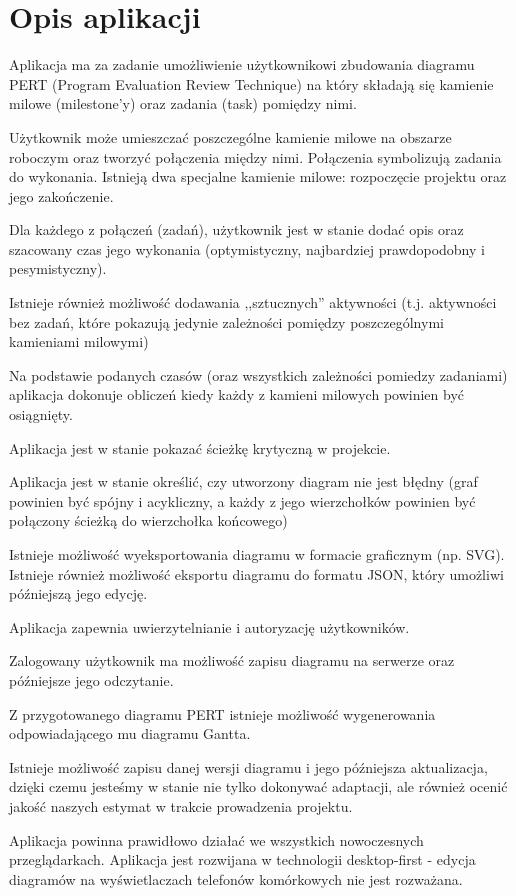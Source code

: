 \section{Opis aplikacji}
Aplikacja ma za zadanie umożliwienie użytkownikowi zbudowania diagramu PERT (Program Evaluation Review Technique) na który składają się kamienie milowe (milestone'y) oraz zadania (task) pomiędzy nimi.

Użytkownik może umieszczać poszczególne kamienie milowe na obszarze roboczym oraz tworzyć połączenia między nimi. Połączenia symbolizują zadania do wykonania. Istnieją dwa specjalne kamienie milowe: rozpoczęcie projektu oraz jego zakończenie.

Dla każdego z połączeń (zadań), użytkownik jest w stanie dodać opis oraz szacowany czas jego wykonania (optymistyczny, najbardziej prawdopodobny i pesymistyczny). 

Istnieje również możliwość dodawania ,,sztucznych'' aktywności (t.j. aktywności bez zadań, które pokazują jedynie zależności pomiędzy poszczególnymi kamieniami milowymi)

Na podstawie podanych czasów (oraz wszystkich zależności pomiedzy zadaniami) aplikacja dokonuje obliczeń kiedy każdy z kamieni milowych powinien być osiągnięty.

Aplikacja jest w stanie pokazać ścieżkę krytyczną w projekcie.

Aplikacja jest w stanie określić, czy utworzony diagram nie jest błędny (graf powinien być spójny i acykliczny, a każdy z jego wierzchołków powinien być połączony ścieżką do wierzchołka końcowego)

Istnieje możliwość wyeksportowania diagramu w formacie graficznym (np. SVG). Istnieje również możliwość eksportu diagramu do formatu JSON, który umożliwi późniejszą jego edycję.

Aplikacja zapewnia uwierzytelnianie i autoryzację użytkowników.

Zalogowany użytkownik ma możliwość zapisu diagramu na serwerze oraz późniejsze jego odczytanie.

Z przygotowanego diagramu PERT istnieje możliwość wygenerowania odpowiadającego mu diagramu Gantta.

Istnieje możliwość zapisu danej wersji diagramu i jego późniejsza aktualizacja, dzięki czemu jesteśmy w stanie nie tylko dokonywać adaptacji, ale również ocenić jakość naszych estymat w trakcie prowadzenia projektu.

Aplikacja powinna prawidłowo działać we wszystkich nowoczesnych przeglądarkach. Aplikacja jest rozwijana w technologii desktop-first - edycja diagramów na wyświetlaczach telefonów komórkowych nie jest rozważana.

